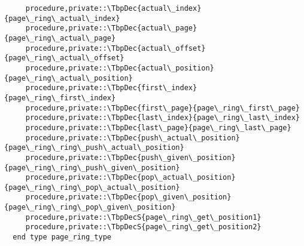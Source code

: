 \begin{Verbatim}
     procedure,private::\TbpDec{actual\_index}{page\_ring\_actual\_index}
     procedure,private::\TbpDec{actual\_page}{page\_ring\_actual\_page}
     procedure,private::\TbpDec{actual\_offset}{page\_ring\_actual\_offset}
     procedure,private::\TbpDec{actual\_position}{page\_ring\_actual\_position}
     procedure,private::\TbpDec{first\_index}{page\_ring\_first\_index}
     procedure,private::\TbpDec{first\_page}{page\_ring\_first\_page}
     procedure,private::\TbpDec{last\_index}{page\_ring\_last\_index}
     procedure,private::\TbpDec{last\_page}{page\_ring\_last\_page}
     procedure,private::\TbpDec{push\_actual\_position}{page\_ring\_ring\_push\_actual\_position}
     procedure,private::\TbpDec{push\_given\_position}{page\_ring\_ring\_push\_given\_position}
     procedure,private::\TbpDec{pop\_actual\_position}{page\_ring\_ring\_pop\_actual\_position}
     procedure,private::\TbpDec{pop\_given\_position}{page\_ring\_ring\_pop\_given\_position}
     procedure,private::\TbpDecS{page\_ring\_get\_position1}
     procedure,private::\TbpDecS{page\_ring\_get\_position2}
  end type page_ring_type
\end{Verbatim}
